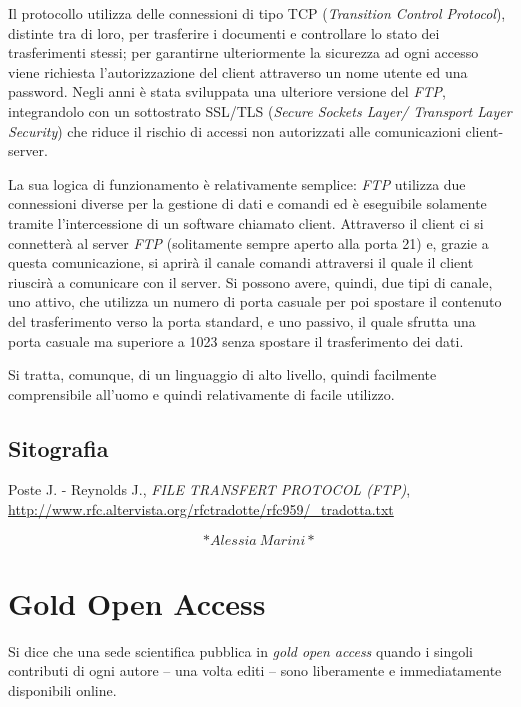 \documentclass[
  b5paper,
  twoside,
  12pt,
  chapterprefix=false,
  bibliography=totocnumbered,
  parskip=false]{scrbook}
\begin{document}
Il protocollo utilizza delle connessioni di tipo TCP (\emph{Transition
Control Protocol}), distinte tra di loro, per trasferire i documenti e
controllare lo stato dei trasferimenti stessi; per garantirne
ulteriormente la sicurezza ad ogni accesso viene richiesta
l'autorizzazione del client attraverso un nome utente ed una password.
Negli anni è stata sviluppata una ulteriore versione del \emph{FTP},
integrandolo con un sottostrato SSL/TLS (\emph{Secure Sockets Layer/
Transport Layer Security}) che riduce il rischio di accessi non
autorizzati alle comunicazioni client-server.

La sua logica di funzionamento è relativamente semplice: \emph{FTP} utilizza
due connessioni diverse per la gestione di dati e comandi ed è
eseguibile solamente tramite l'intercessione di un software chiamato
client. Attraverso il client ci si connetterà al server \emph{FTP}
(solitamente sempre aperto alla porta 21) e, grazie a questa
comunicazione, si aprirà il canale comandi attraversi il quale il client
riuscirà a comunicare con il server. Si possono avere, quindi, due tipi
di canale, uno attivo, che utilizza un numero di porta casuale per poi
spostare il contenuto del trasferimento verso la porta standard, e uno
passivo, il quale sfrutta una porta casuale ma superiore a 1023 senza
spostare il trasferimento dei dati.

Si tratta, comunque, di un linguaggio di alto livello, quindi facilmente
comprensibile all'uomo e quindi relativamente di facile utilizzo.

\hypertarget{sitografia-14}{%
\section*{Sitografia}\label{sitografia-14}}

Poste J. - Reynolds J., \emph{FILE TRANSFERT PROTOCOL (FTP)},
\url{http://www.rfc.altervista.org/rfctradotte/rfc959/_tradotta.txt}

\[*Alessia~Marini*\]

\hypertarget{gold-open-access}{%
\chapter{Gold Open Access}\label{gold-open-access}}

Si dice che una sede scientifica pubblica in \emph{gold open access} quando i
singoli contributi di ogni autore -- una volta editi -- sono liberamente
e immediatamente disponibili online.
\end{document}
